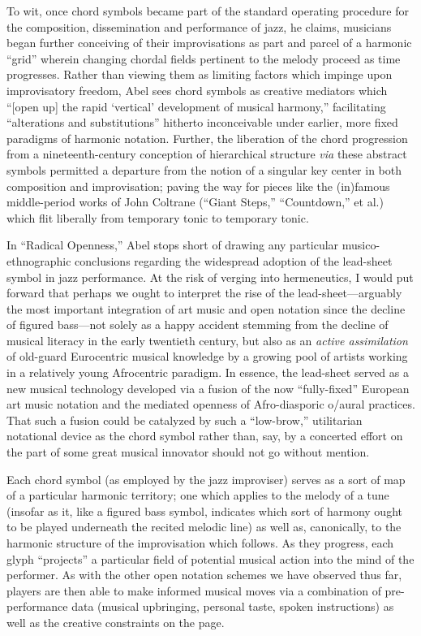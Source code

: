     To wit, once chord symbols became part of the standard operating procedure for the composition, dissemination and performance of jazz, he claims, musicians began further conceiving of their improvisations as part and parcel of a harmonic ``grid'' wherein changing chordal fields pertinent to the melody proceed as time progresses. Rather than viewing them as limiting factors which impinge upon improvisatory freedom, Abel sees chord symbols as creative mediators which ``[open up] the rapid `vertical' development of musical harmony,'' facilitating ``alterations and substitutions'' hitherto inconceivable under earlier, more fixed paradigms of harmonic notation. Further, the liberation of the chord progression from a nineteenth-century conception of hierarchical structure \textit{via} these abstract symbols permitted a departure from the notion of a singular key center in both composition and improvisation; paving the way for pieces like the (in)famous middle-period works of John Coltrane (``Giant Steps,'' ``Countdown,'' et al.) which flit liberally from temporary tonic to temporary tonic.
    
    In ``Radical Openness,'' Abel stops short of drawing any particular musico-ethnographic conclusions regarding the widespread adoption of the lead-sheet symbol in jazz performance. At the risk of verging into hermeneutics, I would put forward that perhaps we ought to interpret the rise of the lead-sheet---arguably the most important integration of art music and open notation since the decline of figured bass---not solely as a happy accident stemming from the decline of musical literacy in the early twentieth century, but also as an \textit{active assimilation} of old-guard Eurocentric musical knowledge by a growing pool of artists working in a relatively young Afrocentric paradigm. In essence, the lead-sheet served as a new musical technology developed via a fusion of the now ``fully-fixed'' European art music notation and the mediated openness of Afro-diasporic o/aural practices. That such a fusion could be catalyzed by such a ``low-brow,'' utilitarian notational device as the chord symbol rather than, say, by a concerted effort on the part of some great musical innovator should not go without mention.

    Each chord symbol (as employed by the jazz improviser) serves as a sort of map of a particular harmonic territory; one which applies to the melody of a tune (insofar as it, like a figured bass symbol, indicates which sort of harmony ought to be played underneath the recited melodic line) as well as, canonically, to the harmonic structure of the improvisation which follows. As they progress, each glyph ``projects'' a particular field of potential musical action into the mind of the performer. As with the other open notation schemes we have observed thus far, players are then able to make informed musical moves via a combination of pre-performance data (musical upbringing, personal taste, spoken instructions) as well as the creative constraints on the page. 

